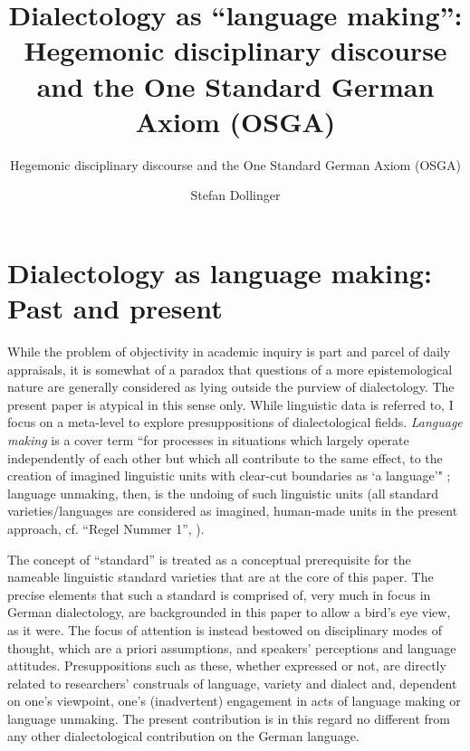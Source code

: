 \documentclass[output=paper]{langscibook}
\author{Stefan Dollinger\orcid{}\affiliation{UBC Vancouver}}
\title[Dialectology as “language making”]{Dialectology as “language making”: Hegemonic disciplinary discourse and the One Standard German Axiom (OSGA)}
\subtitle{Hegemonic disciplinary discourse and the One Standard German Axiom (OSGA)}
\begin{document}
\maketitle
\label{chap:dollinger}
\graphicspath{{figures/dollinger}}


\section{Dialectology as language making: Past and present}
\label{sec:dollinger:1}
While the problem of objectivity in academic inquiry is part and parcel of daily appraisals, it is somewhat of a paradox that questions of a more epistemological nature are generally considered as lying outside the purview of dialectology. The present paper is atypical in this sense only. While linguistic data is referred to, I focus on a meta-level to explore presuppositions of dialectological fields. \textit{Language making} is a cover term ``for processes in situations which largely operate independently of each other but which all contribute to the same effect, to the creation of imagined linguistic units with clear-cut boundaries as `a language'" \citep[2]{KrämerEtAl2022}; language unmaking, then, is the undoing of such linguistic units (all standard varieties/languages are considered as imagined, human-made units in the present approach, cf. “Regel Nummer 1”, \citealt[42]{Dollinger2021}).

The concept of “standard” is treated as a conceptual prerequisite for the nameable linguistic standard varieties that are at the core of this paper. The precise elements that such a standard is comprised of, very much in focus in German dialectology, are backgrounded in this paper to allow a bird's eye view, as it were. The focus of attention is instead bestowed on disciplinary modes of thought, which are a priori assumptions, and speakers’ perceptions and language attitudes. Presuppositions such as these, whether expressed or not, are directly related to researchers’ construals of language, variety and dialect and, dependent on one’s viewpoint, one's (inadvertent) engagement in acts of language making or language unmaking. The present contribution is in this regard no different from any other dialectological contribution on the German language. 
\end{document}
